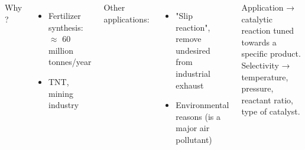 \begin{frame}
\begin{columns}
            \medskip
            \pause
            Why \nitricacid ?
            \begin{itemize}
                \pause
                \item Fertilizer synthesis: $\approx$ 60 million tonnes/year
                \pause
                \item TNT, mining industry
            \end{itemize}            

            \medskip
            \pause
            Other applications:
            \begin{itemize}
                \item "Slip reaction", remove undesired \ammonia from industrial exhaust
                \pause
                \item Environmental reasons (\ammonia is a major air pollutant)
            \end{itemize}
            
            \medskip
            \color{Important}
                \pause
                Application → catalytic reaction tuned towards a specific product.\\
                \pause
                Selectivity → temperature, pressure, reactant ratio, type of catalyst.

    \end{columns}    
\end{frame}